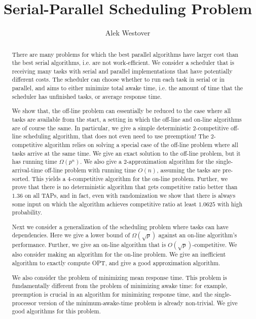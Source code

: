 \documentclass[twocolumn]{article}[10pt]
\author{Alek Westover}
\title{Serial-Parallel Scheduling Problem}
\begin{document}
\maketitle

\begin{abstract}
There are many problems for which the best parallel algorithms
have larger cost than the best serial algorithms, i.e. are not
work-efficient. We consider a scheduler that is receiving many
tasks with serial and parallel implementations that have
potentially different costs. The scheduler can choose whether to
run each task in serial or in parallel, and aims to either
minimize total awake time, i.e. the amount of time that the
scheduler has unfinished tasks, or average response time. 

We show that, the off-line problem can essentially be reduced to
the case where all tasks are available from the start, a setting
in which the off-line and on-line algorithms are of course the
same. In particular, we give a simple deterministic
$2$-competitive off-line scheduling algorithm, that does not even
need to use preemption! The $2$-competitive algorithm relies on
solving a special case of the off-line problem where all tasks
arrive at the same time. We give an exact solution to the
off-line problem, but it has running time $\Omega(p^n)$. We also
give a $2$-approximation algorithm for the single-arrival-time
off-line problem with running time $O(n)$, assuming the tasks are
pre-sorted. This yields a $4$-competitive algorithm for the
on-line problem. Further, we prove that there is no deterministic
algorithm that gets competitive ratio better than $1.36$ on all
TAPs, and in fact, even with randomization we show that there is
always some input on which the algorithm achieves competitive
ratio at least $1.0625$ with high probability.

Next we consider a generalization of the scheduling problem where
tasks can have dependencies. Here we give a lower bound of
$\Omega(\sqrt{p})$ against an on-line algorithm's performance.
Further, we give an on-line algorithm that is
$O(\sqrt{p})$-competitive. We also consider making an algorithm
for the on-line problem. {\color{red}We give an
inefficient algorithm to exactly compute OPT, and give a good
approximation algorithm.}

We also consider the problem of minimizing mean response time.
This problem is fundamentally different from the problem of
minimizing awake time: for example, preemption is crucial in an
algorithm for minimizing response time, and the single-processor
version of the minimum-awake-time problem is already non-trivial.
{\color{red}We give good algorithms for this problem.}

\end{abstract}









\end{document}
